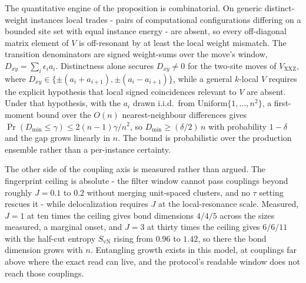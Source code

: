 The quantitative engine of the proposition is combinatorial. On generic distinct-weight instances local trades - pairs of computational configurations differing on a bounded site set with equal instance energy - are absent, so every off-diagonal matrix element of $V$ is off-resonant by at least the local weight mismatch. The transition denominators are signed weight-sums over the move's window, $D_{xy} = \sum_{i} \epsilon_{i} a_{i}$. Distinctness alone secures $D_{xy} \neq 0$ for the two-site moves of $V_{\mathrm{XXZ}}$, where $D_{xy} \in \{\pm(a_{i} + a_{i+1}), \pm(a_{i} - a_{i+1})\}$, while a general $k$-local $V$ requires the explicit hypothesis that local signed coincidences relevant to $V$ are absent. Under that hypothesis, with the $a_{i}$ drawn i.i.d.\ from $\mathrm{Uniform}\{1, \dots, n^{2}\}$, a first-moment bound over the $O(n)$ nearest-neighbour differences gives $\Pr(D_{\min} \le \gamma) \le 2(n-1)\gamma/n^{2}$, so $D_{\min} \ge (\delta/2)\,n$ with probability $1 - \delta$ and the gap grows linearly in $n$. The bound is probabilistic over the production ensemble rather than a per-instance certainty.

The other side of the coupling axis is measured rather than argued. The fingerprint ceiling is absolute - the filter window cannot pass couplings beyond roughly $J = 0.1$ to $0.2$ without merging unit-spaced clusters, and no $\tau$ setting rescues it - while delocalization requires $J$ at the local-resonance scale. Measured, $J = 1$ at ten times the ceiling gives bond dimensions $4/4/5$ across the sizes measured, a marginal onset, and $J = 3$ at thirty times the ceiling gives $6/6/11$ with the half-cut entropy $S_{\mathrm{vN}}$ rising from $0.96$ to $1.42$, so there the bond dimension grows with $n$. Entangling growth exists in this model, at couplings far above where the exact read can live, and the protocol's readable window does not reach those couplings.

